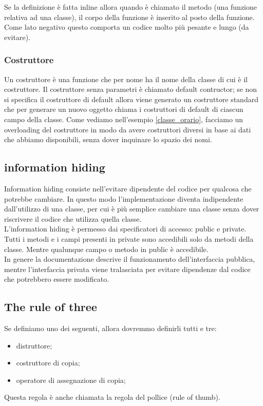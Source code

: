 \documentclass{article}
\begin{document}
Se la definizione è fatta inline allora quando è chiamato il metodo (una
funzione relativa ad una classe), il corpo della funzione è inserito al posto
della funzione. Come lato negativo questo comporta un codice molto più pesante e
lungo (da evitare).

\subsubsection{Costruttore}
Un costruttore è una funzione che per nome ha il nome della classe di cui è il
costruttore. Il costruttore senza parametri è chiamato default contructor;
se non si specifica il costruttore di default allora viene generato un
costruttore standard che per generare un nuovo oggetto chiama i costruttori di
default di ciascun campo della classe.
Come vediamo nell'esempio \ref{classe_orario}, facciamo un overloading del
costruttore in modo da avere costruttori diversi in base ai dati che abbiamo
disponibili, senza dover inquinare lo spazio dei nomi.

\subsection{information hiding}
Information hiding consiste nell'evitare dipendente del codice per qualcosa che
potrebbe cambiare. In questo modo l'implementazione diventa indipendente
dall'utilizzo di una classe, per cui è più semplice cambiare una classe senza
dover riscrivere il codice che utilizza quella classe.\\
L'information hiding è permesso dai specificatori di accesso: public e private.
Tutti i metodi e i campi presenti in private sono accedibili solo da metodi
della classe. Mentre qualunque campo o metodo in public è accedibile.\\
In genere la documentazione descrive il funzionamento dell'interfaccia pubblica,
mentre l'interfaccia privata viene tralasciata per evitare dipendenze dal codice
che potrebbero essere modificato.

\subsection{The rule of three}
Se definiamo uno dei seguenti, allora dovremmo definirli tutti e tre:
\begin{itemize}
    \item distruttore;
    \item costruttore di copia;
    \item operatore di assegnazione di copia;
\end{itemize}
Questa regola è anche chiamata la regola del pollice (rule of thumb).
\end{document}
